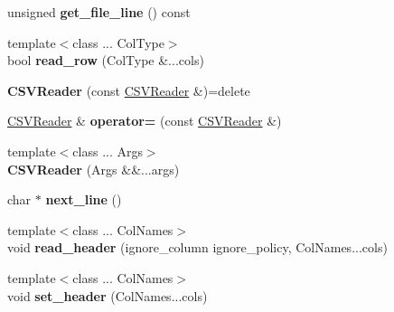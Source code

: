 \begin{DoxyCompactItemize}
\item 
\mbox{\label{classio_1_1_c_s_v_reader_a065f805596018d1568b81152e6a22e0c}} 
unsigned {\bfseries get\+\_\+file\+\_\+line} () const
\item 
\mbox{\label{classio_1_1_c_s_v_reader_a61ecdcaa62c024bf97c4e5d133478d7e}} 
{\footnotesize template$<$class ... Col\+Type$>$ }\\bool {\bfseries read\+\_\+row} (Col\+Type \&...cols)
\item 
\mbox{\label{classio_1_1_c_s_v_reader_a0507ac5abe201969a15df76795e13c28}} 
{\bfseries C\+S\+V\+Reader} (const \hyperlink{classio_1_1_c_s_v_reader}{C\+S\+V\+Reader} \&)=delete
\item 
\mbox{\label{classio_1_1_c_s_v_reader_a37046e6629cf4254037c14440f14141d}} 
\hyperlink{classio_1_1_c_s_v_reader}{C\+S\+V\+Reader} \& {\bfseries operator=} (const \hyperlink{classio_1_1_c_s_v_reader}{C\+S\+V\+Reader} \&)
\item 
\mbox{\label{classio_1_1_c_s_v_reader_a189debf95672e7cd7582e9f73d7203e5}} 
{\footnotesize template$<$class ... Args$>$ }\\{\bfseries C\+S\+V\+Reader} (Args \&\&...args)
\item 
\mbox{\label{classio_1_1_c_s_v_reader_a9fec7797cb27f64360cc48adc5f32c72}} 
char $\ast$ {\bfseries next\+\_\+line} ()
\item 
\mbox{\label{classio_1_1_c_s_v_reader_a9fad9ae02aa243dba6bc78156c5ce7e5}} 
{\footnotesize template$<$class ... Col\+Names$>$ }\\void {\bfseries read\+\_\+header} (ignore\+\_\+column ignore\+\_\+policy, Col\+Names...\+cols)
\item 
\mbox{\label{classio_1_1_c_s_v_reader_ab68eedff1bd59a49fa4ddb160dff94e0}} 
{\footnotesize template$<$class ... Col\+Names$>$ }\\void {\bfseries set\+\_\+header} (Col\+Names...\+cols)
\item 
\mbox{\label{classio_1_1_c_s_v_reader_aaba91fff6faea12e451943e8d32a5a17}} 

\end{DoxyCompactItemize}
